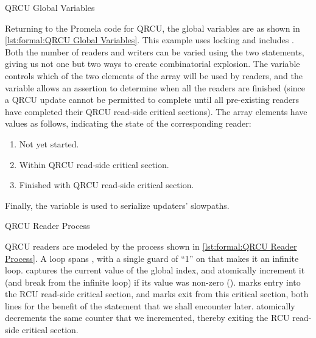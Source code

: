 \begin{listing}

\caption{QRCU Global Variables}
\label{lst:formal:QRCU Global Variables}
\end{listing}

Returning to the Promela code for QRCU, the global variables are as shown in
\cref{lst:formal:QRCU Global Variables}.
This example uses locking and includes .
Both the number of readers and writers can be varied using the
two  statements, giving us not one but two ways to create
combinatorial explosion.
The  variable controls which of the two elements of the 
array will be used by readers, and the  variable
allows an assertion to determine when all the readers are finished
(since a QRCU update cannot be permitted to complete until all
pre-existing readers have completed their QRCU read-side critical
sections).
The  array elements have values as follows,
indicating the state of the corresponding reader:

\begin{enumerate}[label={\arabic*}:,start=0,itemsep=0pt]
\item	Not yet started.
\item	Within QRCU read-side critical section.
\item	Finished with QRCU read-side critical section.
\end{enumerate}

Finally, the  variable is used to serialize updaters' slowpaths.

\begin{listing}

\caption{QRCU Reader Process}
\label{lst:formal:QRCU Reader Process}
\end{listing}

\begin{fcvref}
QRCU readers are modeled by the  process shown in
\cref{lst:formal:QRCU Reader Process}.
A  loop spans ,
with a single guard of ``1''
on  that makes it an infinite loop.
 captures the current value of the global index,
and 
atomically increment it (and break from the infinite loop)
if its value was non-zero ().
 marks entry into the RCU read-side critical section, and
 marks exit from this critical section,
both lines for the benefit of
the  statement that we shall encounter later.
 atomically decrements the same counter that we incremented,
thereby exiting the RCU read-side critical section.
\end{fcvref}

